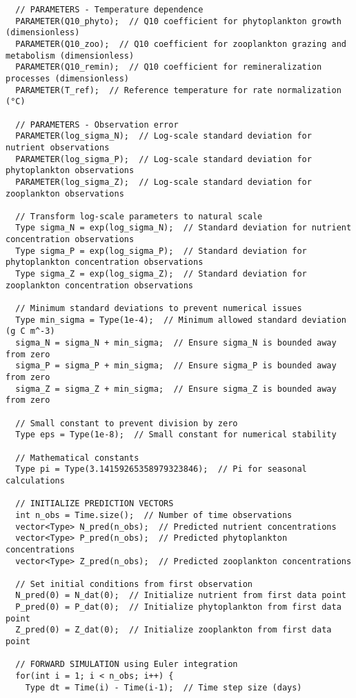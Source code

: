 \begin{lstlisting}
  // PARAMETERS - Temperature dependence
  PARAMETER(Q10_phyto);  // Q10 coefficient for phytoplankton growth (dimensionless)
  PARAMETER(Q10_zoo);  // Q10 coefficient for zooplankton grazing and metabolism (dimensionless)
  PARAMETER(Q10_remin);  // Q10 coefficient for remineralization processes (dimensionless)
  PARAMETER(T_ref);  // Reference temperature for rate normalization (°C)
  
  // PARAMETERS - Observation error
  PARAMETER(log_sigma_N);  // Log-scale standard deviation for nutrient observations
  PARAMETER(log_sigma_P);  // Log-scale standard deviation for phytoplankton observations
  PARAMETER(log_sigma_Z);  // Log-scale standard deviation for zooplankton observations
  
  // Transform log-scale parameters to natural scale
  Type sigma_N = exp(log_sigma_N);  // Standard deviation for nutrient concentration observations
  Type sigma_P = exp(log_sigma_P);  // Standard deviation for phytoplankton concentration observations
  Type sigma_Z = exp(log_sigma_Z);  // Standard deviation for zooplankton concentration observations
  
  // Minimum standard deviations to prevent numerical issues
  Type min_sigma = Type(1e-4);  // Minimum allowed standard deviation (g C m^-3)
  sigma_N = sigma_N + min_sigma;  // Ensure sigma_N is bounded away from zero
  sigma_P = sigma_P + min_sigma;  // Ensure sigma_P is bounded away from zero
  sigma_Z = sigma_Z + min_sigma;  // Ensure sigma_Z is bounded away from zero
  
  // Small constant to prevent division by zero
  Type eps = Type(1e-8);  // Small constant for numerical stability
  
  // Mathematical constants
  Type pi = Type(3.14159265358979323846);  // Pi for seasonal calculations
  
  // INITIALIZE PREDICTION VECTORS
  int n_obs = Time.size();  // Number of time observations
  vector<Type> N_pred(n_obs);  // Predicted nutrient concentrations
  vector<Type> P_pred(n_obs);  // Predicted phytoplankton concentrations
  vector<Type> Z_pred(n_obs);  // Predicted zooplankton concentrations
  
  // Set initial conditions from first observation
  N_pred(0) = N_dat(0);  // Initialize nutrient from first data point
  P_pred(0) = P_dat(0);  // Initialize phytoplankton from first data point
  Z_pred(0) = Z_dat(0);  // Initialize zooplankton from first data point
  
  // FORWARD SIMULATION using Euler integration
  for(int i = 1; i < n_obs; i++) {
    Type dt = Time(i) - Time(i-1);  // Time step size (days)
    

\end{lstlisting}
